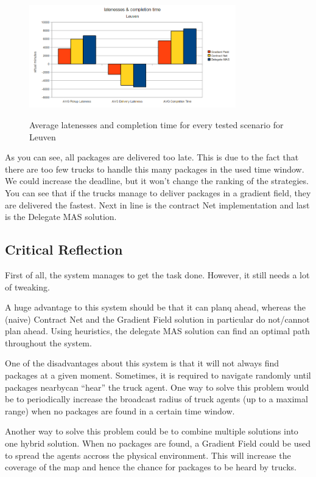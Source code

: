 \begin{figure}[H]
	\begin{center}
		\includegraphics[width=0.8\textwidth]{./figs/leuven_times.png}
		\label{fig:leuven_times}
		\caption{Average latenesses and completion time for every tested scenario for
		Leuven}
	\end{center}
\end{figure}

\npar As you can see, all packages are delivered too late. This is due to the
fact that there are too few trucks to handle this many packages in the used time
window. We could increase the deadline, but it won't change the ranking of the
strategies. You can see that if the trucks manage to deliver packages in a
gradient field, they are delivered the fastest. Next in line is the contract Net
implementation and last is the Delegate MAS solution.

\subsection{Critical Reflection}

\npar First of all, the system manages to get the task done. However, it still
needs a lot of tweaking. 

\npar A huge advantage to this system should be that it can planq ahead, whereas
the (naive) Contract Net and the Gradient Field solution in particular do
not/cannot plan ahead. Using heuristics, the delegate MAS solution can find an
optimal path throughout the system.

\npar One of the disadvantages about this system is that it will not always find
packages at a given moment. Sometimes, it is required to navigate randomly until
packages nearbycan ``hear'' the truck agent. One way to solve this problem would
be to periodically increase the broadcast radius of truck agents (up to a
maximal range) when no packages are found in a certain time window.

\npar Another way to solve this problem could be to combine multiple solutions
into one hybrid solution. When no packages are found, a Gradient Field could be
used to spread the agents accross the physical environment. This will increase
the coverage of the map and hence the chance for packages to be heard by trucks.

